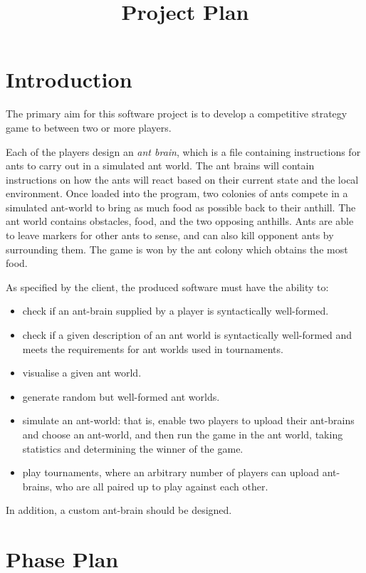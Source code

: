 \documentclass[11pt]{article}
\title{Project Plan}
\date{}
\begin{document}
\maketitle
\tableofcontents
\newpage
\section{Introduction}

The primary aim for this software project is to develop a competitive strategy game to between two or more players.

Each of the players design an \textit{ant brain}, which is a file containing instructions for ants to carry out in a simulated ant world. The ant brains will contain instructions on how the ants will react based on their current state and the local environment. Once loaded into the program, two colonies of ants compete in a simulated ant-world to bring as much food as possible back to their anthill. The ant world contains obstacles, food, and the two opposing anthills. Ants are able to leave markers for other ants to sense, and can also kill opponent ants by surrounding them. The game is won by the ant colony which obtains the most food.

As specified by the client, the produced software must have the ability to:
\begin{itemize}
\item check if an ant-brain supplied by a player is syntactically well-formed.
\item check if a given description of an ant world is syntactically well-formed and meets the requirements for ant worlds used in tournaments.
\item visualise a given ant world.
\item generate random but well-formed ant worlds.
\item simulate an ant-world: that is, enable two players to upload their ant-brains and choose an ant-world, and then run the game in the ant world, taking statistics and determining the winner of the game.
\item play tournaments, where an arbitrary number of players can upload ant-brains, who are all paired up to play against each other.
\end{itemize}

In addition, a custom ant-brain should be designed.

\newpage
\section{Phase Plan}
\end{document}
